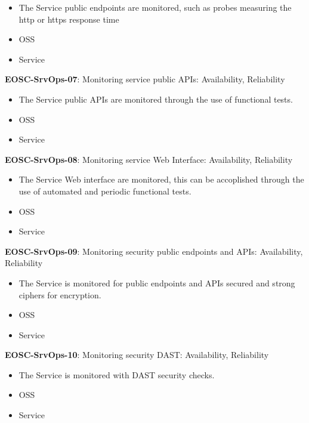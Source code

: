 \begin{itemize}
    \item The Service public endpoints are monitored, such as probes measuring the http or https response time \cite{orviz_fernandez_eosc-synergy_2020}
    \item OSS
    \item Service
\end{itemize}

\textbf{EOSC-SrvOps-07}: Monitoring service public APIs: Availability, Reliability

\begin{itemize}
    \item The Service public APIs are monitored through the use of functional tests. \cite{orviz_fernandez_eosc-synergy_2020}
    \item OSS
    \item Service
\end{itemize}

\textbf{EOSC-SrvOps-08}: Monitoring service Web Interface: Availability, Reliability

\begin{itemize}
    \item The Service Web interface are monitored, this can be accoplished through the use of automated and periodic functional tests. \cite{orviz_fernandez_eosc-synergy_2020}
    \item OSS
    \item Service
\end{itemize}

\textbf{EOSC-SrvOps-09}: Monitoring security public endpoints and APIs: Availability, Reliability

\begin{itemize}
    \item The Service is monitored for public endpoints and APIs secured and strong ciphers for encryption. \cite{orviz_fernandez_eosc-synergy_2020}
    \item OSS
    \item Service
\end{itemize}

\textbf{EOSC-SrvOps-10}: Monitoring security DAST: Availability, Reliability

\begin{itemize}
    \item The Service is monitored with DAST security checks. \cite{orviz_fernandez_eosc-synergy_2020}
    \item OSS
    \item Service
\end{itemize}


